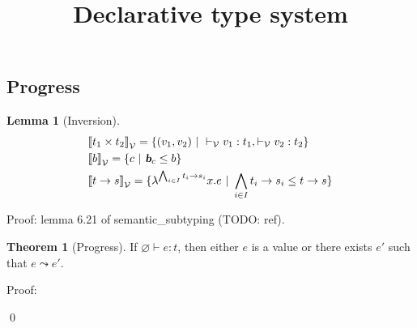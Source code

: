 \documentclass[a4paper]{article}
\title{\vspace{1.5cm}Declarative type system}
\author{}
\date{\vspace{-5ex}}
\theoremstyle{definition}
\newtheorem{theorem}{Theorem}
\newtheorem{lemma}{Lemma}
\begin{document}
  \maketitle

  \subsection{Progress}

      \begin{lemma}[Inversion]
        \begin{align*}
          &\valsemantic{\pair {t_1} {t_2}} = \{(v_1,v_2) \alt \vvdash v_1:t_1, \vvdash v_2:t_2 \}\\
          &\valsemantic{b} = \{c \alt \basic{c} \leq b \}\\
          &\valsemantic{\arrow t s} = \{\lambda^{\bigwedge_{i\in I}\arrow {t_i} {s_i}}x.e \alt \bigwedge_{i\in I}\arrow {t_i} {s_i} \leq \arrow t s\}
        \end{align*}
      \end{lemma}
      Proof: lemma 6.21 of semantic\_subtyping (TODO: ref).

      \begin{theorem}[Progress]
      If $\varnothing \vdash e:t$, then either $e$ is a value or there exists $e'$ such that $e \leadsto e'$.
      \end{theorem}

      Proof:

      \qed
\end{document}
